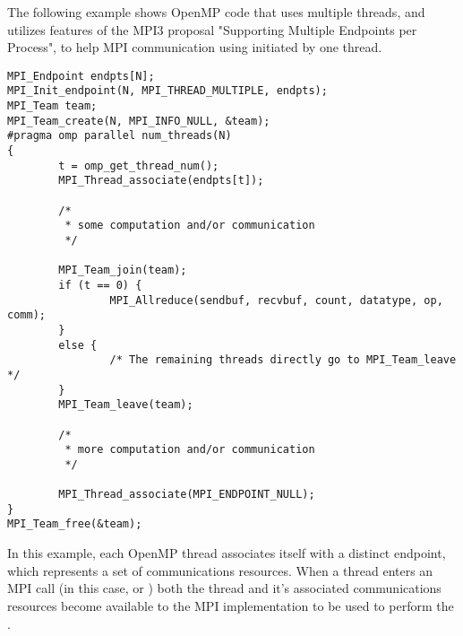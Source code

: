 \begin{example}{\rm
{}%
%
%
%
%
%

The following example shows OpenMP code that uses multiple threads,
and utilizes features of the MPI3 proposal "Supporting Multiple Endpoints per Process",
to help MPI communication using  initiated by one thread.

\begin{verbatim}
MPI_Endpoint endpts[N];
MPI_Init_endpoint(N, MPI_THREAD_MULTIPLE, endpts);
MPI_Team team;
MPI_Team_create(N, MPI_INFO_NULL, &team);
#pragma omp parallel num_threads(N)
{
        t = omp_get_thread_num();
        MPI_Thread_associate(endpts[t]);

        /*
         * some computation and/or communication
         */

        MPI_Team_join(team);
        if (t == 0) {
                MPI_Allreduce(sendbuf, recvbuf, count, datatype, op, comm);
        }
        else {
                /* The remaining threads directly go to MPI_Team_leave */
        }
        MPI_Team_leave(team);

        /*
         * more computation and/or communication
         */

        MPI_Thread_associate(MPI_ENDPOINT_NULL);
}
MPI_Team_free(&team);
\end{verbatim}

In this example, each OpenMP thread associates itself with a distinct
endpoint, which represents a set of communications resources.
When a thread enters an MPI call (in this case,  or
) both the thread and it's associated communications resources
become available to the MPI implementation to be used to perform
the .

}
\end{example}

